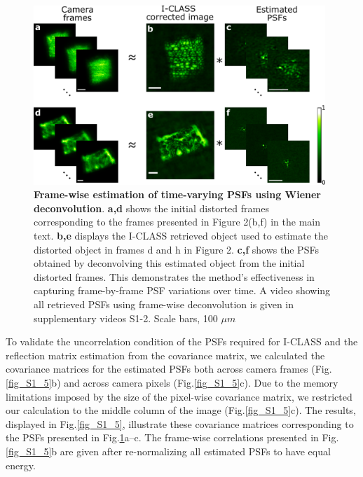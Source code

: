 \documentclass[pdflatex,sn-mathphys-num,Numbered]{sn-jnl}%
\theoremstyle{thmstyleone}%
\theoremstyle{thmstyletwo}%
\theoremstyle{thmstylethree}%
\begin{document}
\begin{figure}[htb!]
	\centering
	\includegraphics [width=0.98\textwidth,]
	{supp_figures/figure_S1.pdf}
         \renewcommand{\thefigure}{S1}

    \caption{\textbf{Frame-wise estimation of time-varying PSFs using Wiener deconvolution}. \textbf{a,d} shows the initial distorted frames corresponding to the frames presented in Figure 2(b,f) in the main text. \textbf{b,e} displays the I-CLASS retrieved object used to estimate the distorted object in frames d and h in Figure 2. \textbf{c,f} shows the PSFs obtained by deconvolving this estimated object from the initial distorted frames. This demonstrates the method's effectiveness in capturing frame-by-frame PSF variations over time. A video showing all retrieved PSFs using frame-wise deconvolution is given in supplementary videos S1-2. Scale bars, 100 $\mu m$}
        \label{fig_S1}
\end{figure} 


To validate the uncorrelation condition of the PSFs required for I-CLASS and the reflection matrix estimation from the covariance matrix, we calculated the covariance matrices for the estimated PSFs both across camera frames (Fig.\ref{fig_S1_5}b) and across camera pixels (Fig.\ref{fig_S1_5}c). Due to the memory limitations imposed by the size of the pixel-wise covariance matrix, we restricted our calculation to the middle column of the image (Fig.\ref{fig_S1_5}c). The results, displayed in Fig.\ref{fig_S1_5}, illustrate these covariance matrices corresponding to the PSFs presented in Fig.\ref{fig_S1}a–c. The frame-wise correlations presented in Fig.\ref{fig_S1_5}b are given after re-normalizing all estimated PSFs to have equal energy.
\end{document}
